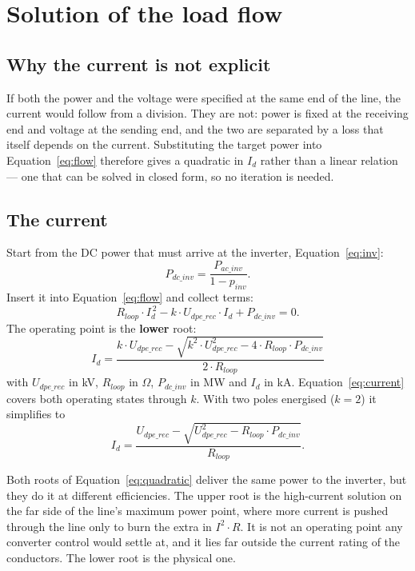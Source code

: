 \section{Solution of the load flow}
\label{sec:solution}

\subsection{Why the current is not explicit}
If both the power and the voltage were specified at the same end of the line,
the current would follow from a division. They are not: power is fixed at the
receiving end and voltage at the sending end, and the two are separated by a
loss that itself depends on the current. Substituting the target power into
Equation~\eqref{eq:flow} therefore gives a quadratic in $I_{d}$ rather than a
linear relation --- one that can be solved in closed form, so no iteration is
needed.

\subsection{The current}
Start from the DC power that must arrive at the inverter,
Equation~\eqref{eq:inv}:
\begin{equation}
  P_{dc\_inv} = \frac{P_{ac\_inv}}{1-p_{inv}} .
  \label{eq:step1}
\end{equation}
Insert it into Equation~\eqref{eq:flow} and collect terms:
\begin{equation}
  R_{loop}\cdot I_{d}^{\,2} - k\cdot U_{dpe\_rec}\cdot I_{d} + P_{dc\_inv} = 0 .
  \label{eq:quadratic}
\end{equation}
The operating point is the \textbf{lower} root:
\begin{equation}
  \boxed{\;
  I_{d} = \frac{k\cdot U_{dpe\_rec} - \sqrt{k^{2}\cdot U_{dpe\_rec}^{2} - 4\cdot R_{loop}\cdot P_{dc\_inv}}}{2\cdot R_{loop}}
  \;}
  \label{eq:current}
\end{equation}
with $U_{dpe\_rec}$ in kV, $R_{loop}$ in $\Omega$, $P_{dc\_inv}$ in MW and $I_{d}$ in
kA. Equation~\eqref{eq:current} covers both operating states through $k$. With
two poles energised ($k=2$) it simplifies to
\begin{equation}
  I_{d} = \frac{U_{dpe\_rec} - \sqrt{U_{dpe\_rec}^{2} - R_{loop}\cdot P_{dc\_inv}}}{R_{loop}} .
  \label{eq:current2}
\end{equation}

Both roots of Equation~\eqref{eq:quadratic} deliver the same power to the
inverter, but they do it at different efficiencies. The upper root is the
high-current solution on the far side of the line's maximum power point, where
more current is pushed through the line only to burn the extra in $I^{2}\cdot R$. It
is not an operating point any converter control would settle at, and it lies
far outside the current rating of the conductors. The lower root is the
physical one.


